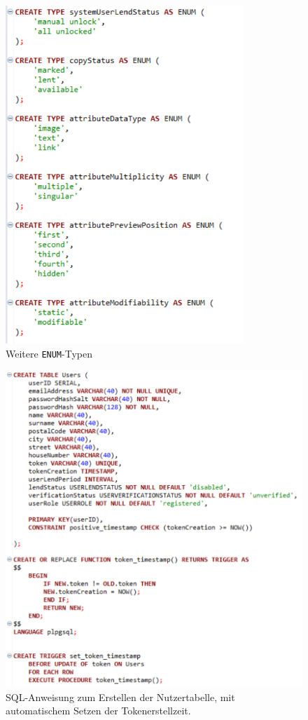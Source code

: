 \documentclass{article}
\begin{document}
\begin{figure}
\centering
\includegraphics[width=9cm]{SQLENUMs2}
\caption{Weitere \texttt{ENUM}-Typen}
\end{figure}

\begin{figure}
\hypertarget{User}{}
\flushleft
\includegraphics[width=50em]{SQLUSER}
\caption{SQL-Anweisung zum Erstellen der Nutzertabelle, mit automatischem Setzen der Tokenerstellzeit.}
\end{figure}
\end{document}
